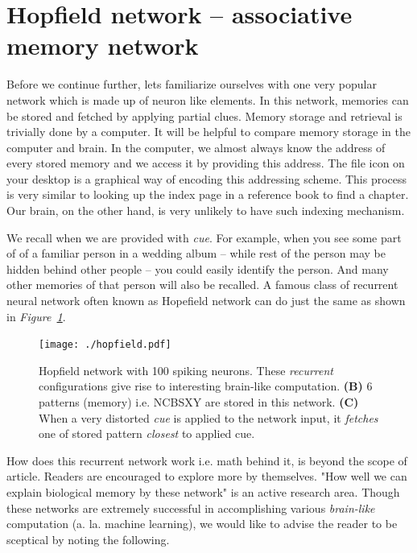 \documentclass[]{resonance}
\newcommand\Fig[1]{\textit{Figure~\ref{#1}}}
\begin{document}
\section{Hopfield network -- associative memory network}\label{sec:hopfield}

Before we continue further, lets familiarize ourselves with one very popular
network which is made up of neuron like elements. In this network, memories can
be stored and fetched by applying partial clues. Memory storage and retrieval is
trivially done by a computer. It will be helpful to compare memory storage in
the computer and brain. In the computer, we almost always know the address of
every stored memory and we access it by providing this address. The file icon on
your desktop is a graphical way of encoding this addressing scheme. This process
is very similar to looking up the index page in a reference book to find a
chapter. Our brain, on the other hand, is very unlikely to have such indexing
mechanism. 

We recall when we are provided with \textit{cue}. For example, when you see some
part of of a familiar person in a wedding album -- while rest of the person may
be hidden behind other people -- you could easily identify the person. And many
other memories of that person will also be recalled. A famous class of recurrent
neural network often known as Hopefield network can do just the same as shown in
\Fig{fig:hopfield}.

\begin{figure}[!hb]
    \centering
    \caption{Hopfield network with 100 spiking neurons. These \emph{recurrent} 
        configurations give rise to interesting brain-like
        computation. \textbf{(B)} 6 patterns (memory) i.e. NCBSXY are stored in this
        network. \textbf{(C)} When a very distorted \textit{cue} is applied to
        the network input, it \textit{fetches} one of stored pattern \emph{closest} to applied cue.
    }\label{fig:hopfield}
    \texttt{[image: ./hopfield.pdf]}
\end{figure}

How does this recurrent network work i.e. math behind it, is beyond the scope of
article. Readers are encouraged to explore more by themselves. "How well we can
explain biological memory by these network" is an active research area.  Though
these networks are extremely successful in accomplishing various
\textit{brain-like} computation (a. la. machine learning), we would like to
advise the reader to be sceptical by noting the following.
\end{document}
